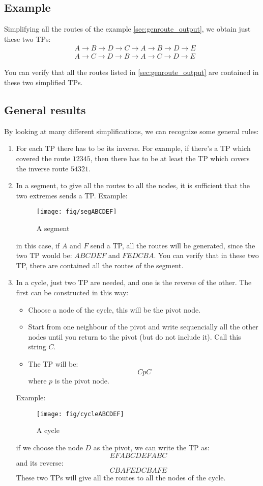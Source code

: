 \documentclass[a4paper]{article}
\begin{document}
\subsection*{Example}
Simplifying all the routes of the example \ref{sec:genroute_output}, we obtain
just these two TPs:
\begin{align}
 &A \rightarrow B \rightarrow D \rightarrow C \rightarrow A \rightarrow B
 \rightarrow D \rightarrow E\\
 &A \rightarrow C \rightarrow D \rightarrow B \rightarrow A \rightarrow C \rightarrow D \rightarrow E
\end{align}

You can verify that all the routes listed in \ref{sec:genroute_output} are
contained in these two simplified TPs.

\subsection{General results}
By looking at many different simplifications, we can recognize some general
rules:
\begin{enumerate}
	\item For each TP there has to be its inverse. For example, if there's
		a TP which covered the route $12345$, then there has to be at
		least the TP which covers the inverse route $54321$.
	\item In a segment, to give all the routes to all the nodes, it is
		sufficient that the two extremes sends a TP. Example:
		\begin{figure}[h]
			\begin{center}
				\texttt{[image: fig/segABCDEF]}
			\end{center}
			\caption{A segment}
		\end{figure}
		in this case, if $A$ and $F$ send a TP, all the routes will be
		generated, since the two TP would be: $ABCDEF$ and $FEDCBA$.
		You can verify that in these two TP, there are contained all
		the routes of the segment.
	\item In a cycle, just two TP are needed, and one is the reverse of
		the other. The first can be constructed in this way: 
		\begin{itemize}
			\item Choose a node of the cycle, this will be the
				pivot node.
			\item Start from one neighbour of the pivot and write
				sequencially all the other nodes until you
				return to the pivot (but do not include it).
				Call this string $C$.
			\item The TP will be:
				\[CpC\]
				where $p$ is the pivot node.
		\end{itemize}
		Example:
		\begin{figure}[h]
			\begin{center}
				\texttt{[image: fig/cycleABCDEF]}
			\end{center}
			\caption{A cycle}
		\end{figure}
		if we choose the node $D$ as the pivot, we can write the TP
		as:
		\[ EFABCDEFABC \]
		and its reverse:
		\[ CBAFEDCBAFE \]
		These two TPs will give all the routes to all the nodes of the
		cycle.
\end{enumerate}
\end{document}
